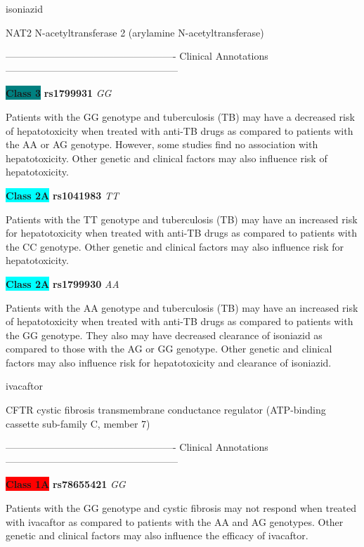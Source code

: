 \documentclass{resume} %
\begin{document}
\begin{rSection}{ isoniazid }
\begin{rSubsection}{ NAT2 }{ N-acetyltransferase 2 (arylamine N-acetyltransferase) }{}{}
\item[] ---------------------------------------------------- Clinical Annotations -----------------------------------------------------\newline
\item \textbf{\colorbox{teal} {Class 3}} \textbf{ rs1799931 } \textit{ GG }
\item[] Patients with the GG genotype and tuberculosis (TB) may have a decreased risk of hepatotoxicity when treated with anti-TB drugs as compared to patients with the AA or AG genotype. However, some studies find no association with hepatotoxicity. Other genetic and clinical factors may also influence risk of hepatotoxicity.\item \textbf{\colorbox{cyan} {Class 2A}} \textbf{ rs1041983 } \textit{ TT }
\item[] Patients with the TT genotype and tuberculosis (TB) may have an increased risk for hepatotoxicity when treated with anti-TB drugs as compared to patients with the CC genotype. Other genetic and clinical factors may also influence risk for hepatotoxicity.\item \textbf{\colorbox{cyan} {Class 2A}} \textbf{ rs1799930 } \textit{ AA }
\item[] Patients with the AA genotype and tuberculosis (TB) may have an increased risk of hepatotoxicity when treated with anti-TB drugs as compared to patients with the GG genotype. They also may have decreased clearance of isoniazid as compared to those with the AG or GG genotype. Other genetic and clinical factors may also influence risk for hepatotoxicity and clearance of isoniazid.
\end{rSubsection}

\end{rSection}\begin{rSection}{ ivacaftor }
\item[]

\begin{rSubsection}{ CFTR }{ cystic fibrosis transmembrane conductance regulator (ATP-binding cassette sub-family C, member 7) }{}{}
\item[]

\item[] ---------------------------------------------------- Clinical Annotations -----------------------------------------------------\newline
\item \textbf{\colorbox{red} {Class 1A}} \textbf{ rs78655421 } \textit{ GG }
\item[] Patients with the GG genotype and cystic fibrosis may not respond when treated with ivacaftor as compared to patients with the AA and AG genotypes. Other genetic and clinical factors may also influence the efficacy of ivacaftor.
\end{rSubsection}


\end{rSection}
\end{document}
